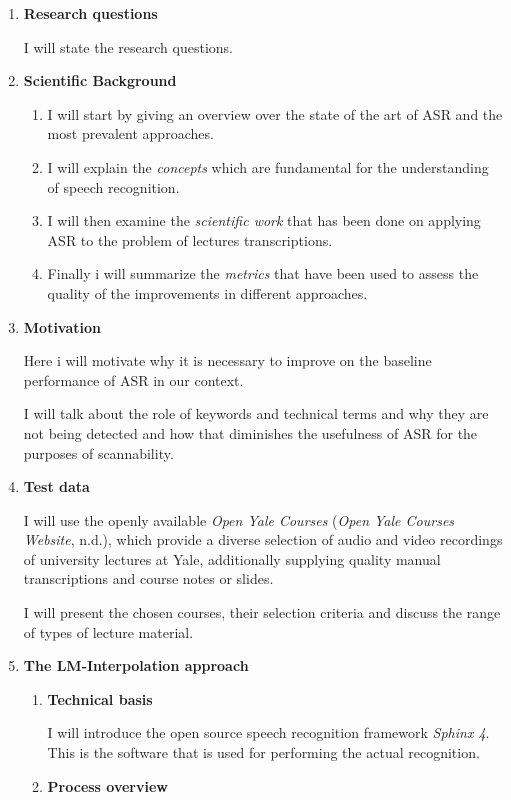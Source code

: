 \documentclass[]{article}
\begin{document}
\begin{enumerate}
\def\labelenumi{(\arabic{enumi})}
\item
  \textbf{Research questions}

  I will state the research questions.
\item
  \textbf{Scientific Background}

  \begin{enumerate}
  \item
    I will start by giving an overview over the state of the art of ASR
    and the most prevalent approaches.
  \item
    I will explain the \emph{concepts} which are fundamental for the
    understanding of speech recognition.
  \item
    I will then examine the \emph{scientific work} that has been done on
    applying ASR to the problem of lectures transcriptions.
  \item
    Finally i will summarize the \emph{metrics} that have been used to
    assess the quality of the improvements in different approaches.
  \end{enumerate}
\item
  \textbf{Motivation}

  Here i will motivate why it is necessary to improve on the baseline
  performance of ASR in our context.

  I will talk about the role of keywords and technical terms and why
  they are not being detected and how that diminishes the usefulness of
  ASR for the purposes of scannability.
\item
  \textbf{Test data}

  I will use the openly available \emph{Open Yale Courses} (\emph{Open
  Yale Courses Website}, n.d.), which provide a diverse selection of
  audio and video recordings of university lectures at Yale,
  additionally supplying quality manual transcriptions and course notes
  or slides.

  I will present the chosen courses, their selection criteria and
  discuss the range of types of lecture material.
\item
  \textbf{The LM-Interpolation approach}

  \begin{enumerate}
  \item
    \textbf{Technical basis}

    I will introduce the open source speech recognition framework
    \emph{Sphinx 4}. This is the software that is used for performing
    the actual recognition.
  \item
    \textbf{Process overview}


\end{enumerate}
\end{enumerate}
\end{document}
